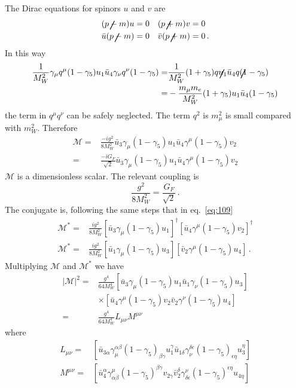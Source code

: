 The Dirac equations for spinors $u$ and $v$ are
\begin{align}
  (\cancel{p}-m)u&=0&(\cancel{p}+m )v&=0\nonumber\\
  \bar{u}(\cancel{p}-m)&=0&\bar{v}(\cancel{p}+m )&=0\,.
\end{align}
In this way
\begin{align}
  \frac{1}{M_W^2}\gamma_\mu q^\mu(1-\gamma_5)u_1 \bar{u}_4\gamma_\nu q^\nu(1-\gamma_5)
  =&\frac{1}{M_W^2}(1+\gamma_5)\cancel{q}u_1 \bar{u}_4\cancel{q}(1-\gamma_5)\nonumber\\
  =&-\frac{m_\mu m_e}{M_W^2}(1+\gamma_5)u_1 \bar{u}_4(1-\gamma_5)\,
\end{align}
the term in $q^\mu q^\nu$ can be safely neglected. The term $q^2$ is $m_\mu^2$ is small compared with $m_W^2$. Therefore
\begin{align}
  \mathcal{M}=&\frac{-i g^2}{8M_W^2}\bar{u}_3\gamma_\mu(1-\gamma_5)u_1\bar{u}_4\gamma^\mu(1-\gamma_5)v_2\nonumber\\
  =&\frac{-i G_F}{\sqrt{2}}\bar{u}_3\gamma_\mu(1-\gamma_5)u_1\bar{u}_4\gamma^\mu(1-\gamma_5)v_2
\end{align}
$\mathcal{M}$ is a dimensionless scalar. The relevant coupling is
\begin{equation}
  \frac{g^2}{8M_W^2}=\frac{G_F}{\sqrt{2}}\,.
\end{equation}
The conjugate is, following  the same steps that in eq.~\eqref{eq:109}
\begin{align}
  \mathcal{M}^*=&\frac{i g^2}{8M_W^2}\left[\bar{u}_3\gamma_\mu(1-\gamma_5)u_1\right]^\dagger
  \left[\bar{u}_4\gamma^\mu(1-\gamma_5)v_2\right]^\dagger\nonumber\\
   \mathcal{M}^*=&\frac{i g^2}{8M_W^2}\left[\bar{u}_1\gamma_\mu(1-\gamma_5)u_3\right]
  \left[\bar{v}_2\gamma^\mu(1-\gamma_5)u_4\right]\,.
\end{align}
Multiplying $\mathcal{M}$ and $\mathcal{M}^*$ we have
\begin{align}
  \label{eq:110}
  |\mathcal{M}|^2=&\frac{g^4}{64 M_W^4}\left[\bar{u}_3\gamma_\mu(1-\gamma_5)u_1\bar{u}_1\gamma_\nu(1-\gamma_5)u_3\right]\nonumber\\
  &\times\left[\bar{u}_4\gamma^\mu(1-\gamma_5)v_2\bar{v}_2\gamma^\nu(1-\gamma_5)u_4\right]\nonumber\\
  =&\frac{g^4}{64 M_W^4}L_{\mu\nu}M^{\mu\nu}
\end{align}
where
\begin{align}
   L_{\mu\nu}=&\left[\bar{u}_{3\alpha}\gamma_\mu^{\alpha\beta}(1-\gamma_5)_{\beta\gamma}u_1^\gamma\bar{u}_{1\delta}\gamma_\nu^{\delta\epsilon}(1-\gamma_5)_{\epsilon\eta}u_3^\eta\right]\nonumber\\
  M^{\mu\nu}=&\left[\bar{u}_4^\alpha\gamma^\mu_{\alpha\beta}(1-\gamma_5)^{\beta\gamma}v_{2\gamma}\bar{v}_2^\delta\gamma^\nu_{\delta\epsilon}(1-\gamma_5)^{\epsilon\eta}u_{4\eta}\right]
\end{align}
